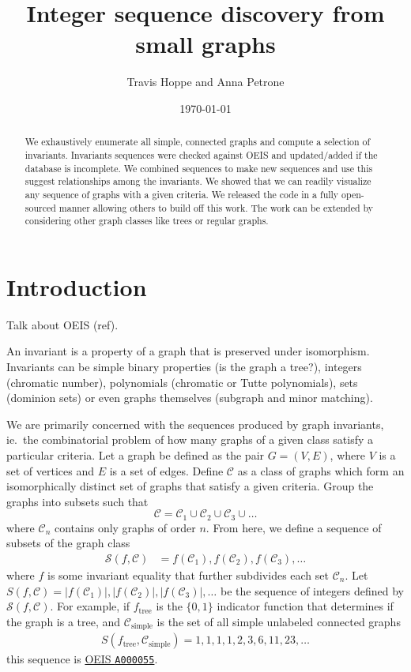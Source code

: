 \documentclass[12pt]{article}
\newcommand{\OEIS}[1]
{\href{https://oeis.org/#1}{OEIS \texttt{#1}}}
\begin{document}
\title{Integer sequence discovery from small graphs}
\author{Travis Hoppe and Anna Petrone}
\date{\today}
\maketitle

\begin{abstract}
We exhaustively enumerate all simple, connected graphs and compute a selection of invariants. 
Invariants sequences were checked against OEIS and updated/added if the database is incomplete.
We combined sequences to make new sequences and use this suggest relationships among the invariants.
We showed that we can readily visualize any sequence of graphs with a given criteria.
We released the code in a fully open-sourced manner allowing others to build off this work.
The work can be extended by considering other graph classes like trees or regular graphs.
\end{abstract}

\section{Introduction}

Talk about OEIS (ref).

An invariant is a property of a graph that is preserved under isomorphism. 
Invariants can be simple binary properties (is the graph a tree?), integers (chromatic number), polynomials (chromatic or Tutte polynomials), sets (dominion sets) or even graphs themselves (subgraph and minor matching).

We are primarily concerned with the sequences produced by graph invariants, ie.\ the combinatorial problem of how many graphs of a given class satisfy a particular criteria.
Let a graph be defined as the pair $G = (V,E)$, where $V$ is a set of vertices and $E$ is a set of edges. 
Define $\mathcal{C}$ as a class of graphs which form an isomorphically distinct set of graphs that satisfy a given criteria.
Group the graphs into subsets such that
\begin{equation}
\mathcal{C} = \mathcal{C}_1 \cup \mathcal{C}_2 \cup \mathcal{C}_3 \cup \ldots
\end{equation}
where $\mathcal{C}_n$ contains only graphs of order $n$.
From here, we define a sequence of subsets of the graph class
%
\begin{align}
\mathcal{S}(f, \mathcal{C}) 
&= f(\mathcal{C}_1), f(\mathcal{C}_2), f(\mathcal{C}_3), \ldots 
\end{align}
%
where $f$ is some invariant equality that further subdivides each set $\mathcal{C}_n$. 
Let 
$S(f, \mathcal{C}) = |f(\mathcal{C}_1)|, |f(\mathcal{C}_2)|, |f(\mathcal{C}_3)|, \ldots$
be the sequence of integers defined by $\mathcal{S}(f, \mathcal{C})$.
For example, if $f_\text{tree}$ is the $\{0,1\}$ indicator function that determines if the graph is a tree, and $\mathcal{C}_\text{simple}$ is the set of all simple unlabeled connected graphs
%
\begin{align}
S(f_\text{tree}, \mathcal{C}_\text{simple}) = 1, 1, 1, 1, 2, 3, 6, 11, 23, \ldots
\end{align}
%
this sequence is \OEIS{A000055}.
\end{document}
